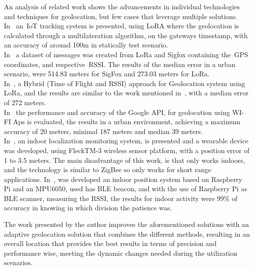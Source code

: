 An analysis of related work shows the advancements in individual technologies and techniques for geolocation, but few cases that leverage multiple solutions.\\
In~\cite{Fargas2017RL1} an~\gls{IoT} tracking system is presented, using LoRA where the geolocation is calculated through a multilateration algorithm, on the gateways timestamp, with an accuracy of around 100m in statically test scenario.\\
In~\cite{Aernouts2018RL2} a dataset of messages was created from LoRa and Sigfox containing the~\gls{GPS} coordinates, and respective~\gls{RSSI}. The results of the median error in a urban scenario, were 514.83 meters for SigFox and 273.03 meters for LoRa.\\ 
In~\cite{Danebjer2018}, a Hybrid (Time of Flight and RSSI) approach for Geolocation system using LoRa,  and the results are similar to the work mentioned in~\cite{Aernouts2018RL2}, with a median error of 272 meters.\\
In~\cite{RL3} the performance and accuracy of the Google API, for geolocation using WI-FI Aps is evaluated, the results in a urban environment, achieving a maximum accuracy of 20 meters, minimal 187 meters and median 39 meters.\\
In~\cite{DSouza2012RL4}, an  indoor localization monitoring system, is presented and a wearable device was developed, using FleckTM-3 wireless sensor platform, with a position error of 1 to 3.5 meters. The main disadvantage of this work, is that only works indoors, and the technology is similar to ZigBee so only works for short range applications.
In~\cite{Tabbakha2018}, was developed an indoor position system based on Raspberry Pi and an MPU6050, used has BLE beacon, and with the use of Raspberry Pi as BLE scanner, measuring the RSSI, the results for indoor activity were 99\% of accuracy in knowing in which division the patience was.

The work presented by the author improves the aforementioned solutions with an adaptive geolocation solution that combines the different methods, resulting in an overall location that provides the best results in terms of precision and performance wise, meeting the dynamic changes needed during the utilization scenarios.


